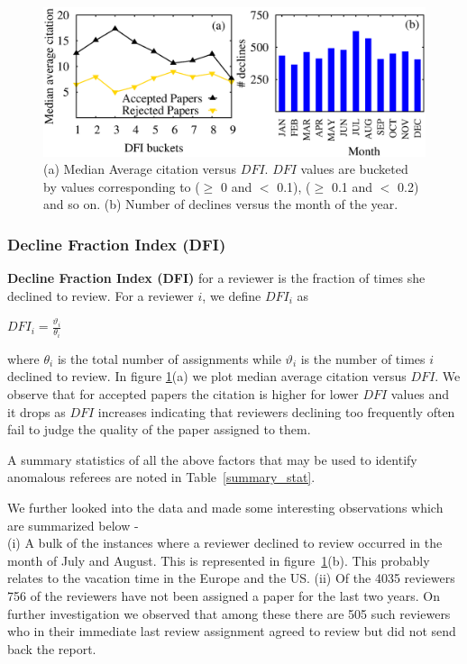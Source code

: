 \begin{figure}
\centering
\includegraphics[scale=0.4]{./texfiles/Chapter_4/cikm/figures/DFI_dec_month.eps}
\caption{\label{fig_dfi}(a) Median Average citation versus $DFI$. $DFI$ values are bucketed by values corresponding to ($\geq$ 0 and $<$ 0.1), ($\geq$ 0.1 and $<$ 0.2) and so on. (b) Number of declines versus the month of the year.}
\end{figure}

\subsubsection{Decline Fraction Index (DFI)}

{\bf Decline Fraction Index (DFI)} for a reviewer is the fraction of times she declined to review. For a reviewer $i$, we define $DFI_{i}$ as
\begin{center}
$DFI_{i}=\frac{\vartheta_{i}}{\theta_{i}}$
\end{center}

\noindent where $\theta_{i}$ is the total number of assignments while $\vartheta_{i}$ is the number of times $i$ declined to review. 
In figure \ref{fig_dfi}(a) we plot median average citation versus $DFI$. We observe that for accepted papers the citation is higher for lower $DFI$ values and it drops as $DFI$ increases indicating that reviewers declining too frequently often fail to judge the quality of the paper assigned to them.

A summary statistics of all the above factors that may be used to identify anomalous referees are noted in Table~\ref{summary_stat}.

We further looked into the data and made some interesting observations which are summarized below - \\
(i) A bulk of the instances where a reviewer declined to review occurred in the month of July and August. This is represented in figure~\ref{fig_dfi}(b). This probably relates to the vacation time in the Europe and the US.
(ii) Of the 4035 reviewers 756 of the reviewers have not been assigned a paper for the last two years. On further investigation we observed that among these there are 505 such reviewers who in their immediate last review assignment agreed to review but did not send back the report.


